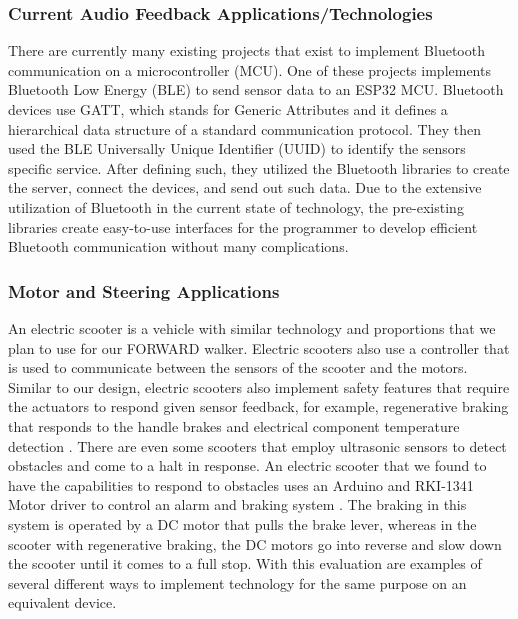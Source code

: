 \subsubsection{Current Audio Feedback Applications/Technologies}
\noindent There are currently many existing projects that exist to implement Bluetooth communication on a microcontroller (MCU). One of these projects \cite{bluetoothSensorProject} implements Bluetooth Low Energy (BLE) to send sensor data to an ESP32 MCU. Bluetooth devices use GATT, which stands for Generic Attributes and it defines a hierarchical data structure of a standard communication protocol. They then used the BLE Universally Unique Identifier (UUID) to identify the sensors specific service. After defining such, they utilized the Bluetooth libraries to create the server, connect the devices, and send out such data. Due to the extensive utilization of Bluetooth in the current state of technology, the pre-existing libraries create easy-to-use interfaces for the programmer to develop efficient Bluetooth communication without many complications.

\subsubsection{Motor and Steering Applications}
\noindent An electric scooter is a vehicle with similar technology and proportions that we plan to use for our FORWARD walker. Electric scooters also use a controller that is used to communicate between the sensors of the scooter and the motors. Similar to our design, electric scooters also implement safety features that require the actuators to respond given sensor feedback, for example, regenerative braking that responds to the handle brakes and electrical component temperature detection \cite{apollo}. There are even some scooters that employ ultrasonic sensors to detect obstacles and come to a halt in response. An electric scooter that we found to have the capabilities to respond to obstacles uses an Arduino and RKI-1341 Motor driver to control an alarm and braking system \cite{hwang2020}. The braking in this system is operated by a DC motor that pulls the brake lever, whereas in the scooter with regenerative braking, the DC motors go into reverse and slow down the scooter until it comes to a full stop. With this evaluation are examples of several different ways to implement technology for the same purpose on an equivalent device.